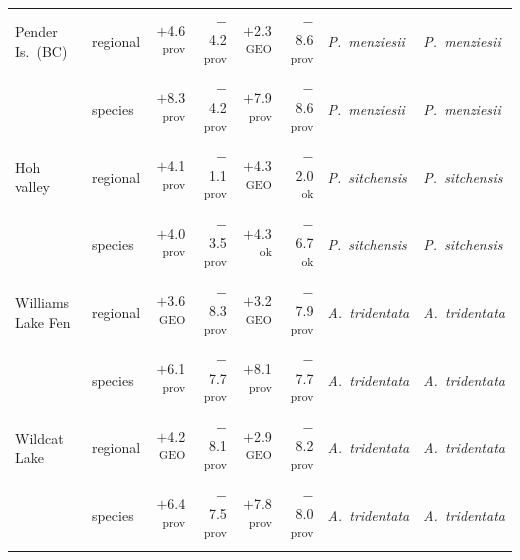 {\begin{longtable}{>{\raggedright\arraybackslash}p{}lrrrr>{\raggedright\arraybackslash}p{}>{\raggedright\arraybackslash}p{}}
Pender Is.\ (BC) & regional & $+$4.6 \textsuperscript{prov} & $-$4.2 \textsuperscript{prov} & $+$2.3 \textsuperscript{GEO} & $-$8.6 \textsuperscript{prov} & \emph{P.\ menziesii} & \emph{P.\ menziesii} \\
 & species & $+$8.3 \textsuperscript{prov} & $-$4.2 \textsuperscript{prov} & $+$7.9 \textsuperscript{prov} & $-$8.6 \textsuperscript{prov} & \emph{P.\ menziesii} & \emph{P.\ menziesii} \\
Hoh valley & regional & $+$4.1 \textsuperscript{prov} & $-$1.1 \textsuperscript{prov} & $+$4.3 \textsuperscript{GEO} & $-$2.0 \textsuperscript{ok} & \emph{P.\ sitchensis} & \emph{P.\ sitchensis} \\
 & species & $+$4.0 \textsuperscript{prov} & $-$3.5 \textsuperscript{prov} & $+$4.3 \textsuperscript{ok} & $-$6.7 \textsuperscript{ok} & \emph{P.\ sitchensis} & \emph{P.\ sitchensis} \\
Williams Lake Fen & regional & $+$3.6 \textsuperscript{GEO} & $-$8.3 \textsuperscript{prov} & $+$3.2 \textsuperscript{GEO} & $-$7.9 \textsuperscript{prov} & \emph{A.\ tridentata} & \emph{A.\ tridentata} \\
 & species & $+$6.1 \textsuperscript{prov} & $-$7.7 \textsuperscript{prov} & $+$8.1 \textsuperscript{prov} & $-$7.7 \textsuperscript{prov} & \emph{A.\ tridentata} & \emph{A.\ tridentata} \\
Wildcat Lake & regional & $+$4.2 \textsuperscript{GEO} & $-$8.1 \textsuperscript{prov} & $+$2.9 \textsuperscript{GEO} & $-$8.2 \textsuperscript{prov} & \emph{A.\ tridentata} & \emph{A.\ tridentata} \\
 & species & $+$6.4 \textsuperscript{prov} & $-$7.5 \textsuperscript{prov} & $+$7.8 \textsuperscript{prov} & $-$8.0 \textsuperscript{prov} & \emph{A.\ tridentata} & \emph{A.\ tridentata} \\
\end{longtable}
}
